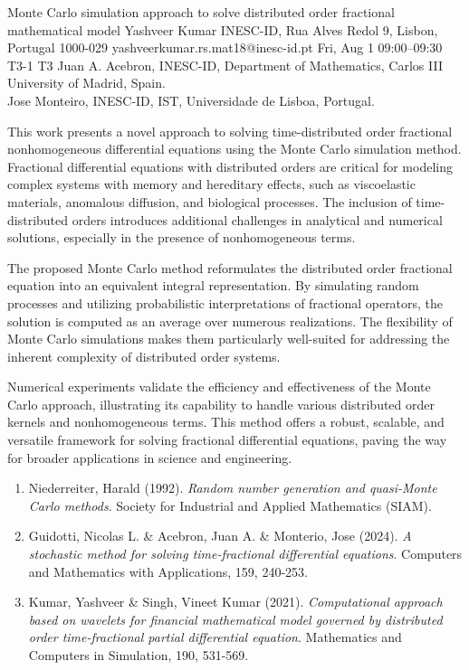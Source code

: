 \documentclass[12pt,lettersize,oneside]{book} %
\begin{document}
\begin{talk}
  {Monte Carlo simulation approach to solve distributed order fractional mathematical model}%
  {Yashveer Kumar}%
  {INESC-ID, Rua Alves Redol 9, Lisbon, Portugal 1000-029}%
  {yashveerkumar.rs.mat18@inesc-id.pt}%
  {}%
  {}%
  {Fri, Aug 1 09:00--09:30}%
  {T3-1}%
  {T3}%
  {Juan A. Acebron, INESC-ID,  Department of Mathematics, Carlos III University of Madrid, Spain.\\
   Jose Monteiro, INESC-ID, IST, Universidade de Lisboa, Portugal.}%
    
   
   
This work presents a novel approach to solving time-distributed order fractional nonhomogeneous differential equations using the Monte Carlo simulation method. Fractional differential equations with distributed orders are critical for modeling complex systems with memory and hereditary effects, such as viscoelastic materials, anomalous diffusion, and biological processes. The inclusion of time-distributed orders introduces additional challenges in analytical and numerical solutions, especially in the presence of nonhomogeneous terms.

The proposed Monte Carlo method reformulates the distributed order fractional equation into an equivalent integral representation. By simulating random processes and utilizing probabilistic interpretations of fractional operators, the solution is computed as an average over numerous realizations. The flexibility of Monte Carlo simulations makes them particularly well-suited for addressing the inherent complexity of distributed order systems.

Numerical experiments validate the efficiency and effectiveness of the Monte Carlo approach, illustrating its capability to handle various distributed order kernels and nonhomogeneous terms. This method offers a robust, scalable, and versatile framework for solving fractional differential equations, paving the way for broader applications in science and engineering.

\medskip
\begin{enumerate}
 \item[{[1]}] Niederreiter, Harald (1992). {\it Random number generation and quasi-Monte Carlo methods}. Society for Industrial and Applied Mathematics (SIAM).
 \item[{[2]}] Guidotti, Nicolas L. \& Acebron, Juan A.  \&  Monterio, Jose (2024). {\it A stochastic method for solving time-fractional differential equations}. Computers and Mathematics with Applications, 159, 240-253.
 \item[{[3]}] Kumar, Yashveer \& Singh, Vineet Kumar (2021). {\it Computational approach based on wavelets for financial mathematical model governed by distributed order time-fractional partial differential equation}. Mathematics and Computers in Simulation, 190, 531-569.
\end{enumerate}
\end{talk}
\end{document}
